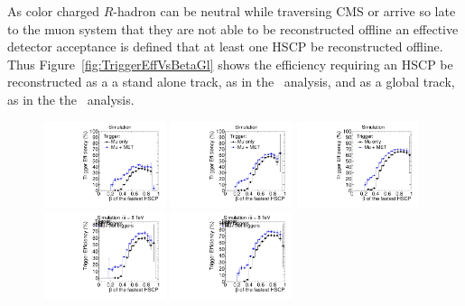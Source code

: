 As color charged $R$-hadron can be neutral
while traversing CMS or arrive so late to the muon system that they are not able to be reconstructed offline an effective detector acceptance is defined 
that at least one HSCP be reconstructed offline. Thus Figure~\ref{fig:TriggerEffVsBetaGl} shows the efficiency requiring an HSCP be reconstructed as a a stand alone track,
as in the \muononly\ analysis, and as a global track, as in the the \tktof\ analysis.

\begin{figure}
\centering
  \includegraphics[clip=true, trim=0.0cm 0cm 3.0cm 0cm, width=0.32\textwidth]{figures/search/Gluino_8TeV_M1200_f100MatchedSA}
  \includegraphics[clip=true, trim=0.0cm 0cm 3.0cm 0cm, width=0.32\textwidth]{figures/search/Gluino_8TeV_M1200_f10MatchedSA}
  \includegraphics[clip=true, trim=0.0cm 0cm 3.0cm 0cm, width=0.32\textwidth]{figures/search/Stop_8TeV_M800MatchedSA}
  \includegraphics[clip=true, trim=0.0cm 0cm 3.0cm 0cm, width=0.32\textwidth]{figures/search/Gluino_8TeV_M1200_f10MatchedGl}
  \includegraphics[clip=true, trim=0.0cm 0cm 3.0cm 0cm, width=0.32\textwidth]{figures/search/Stop_8TeV_M800MatchedGl}

\end{figure}
